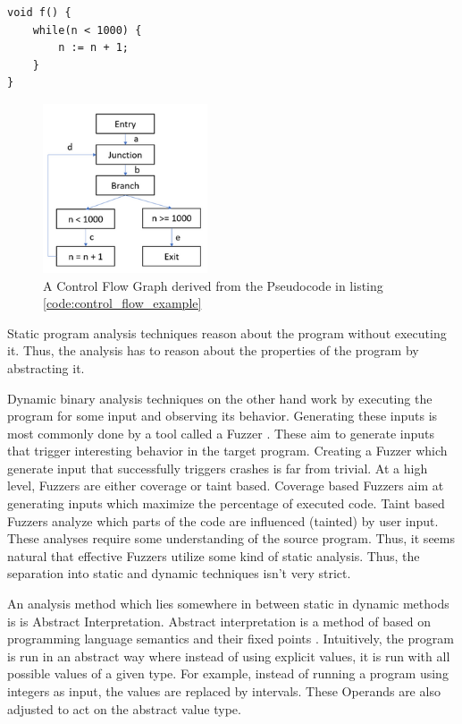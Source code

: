 \documentclass[sigconf]{acmart}
\begin{document}
\begin{lstlisting}[style=CStyle, label=code:control_flow_example, caption={This pseudocode corresponds to the control flow graph in Figure \ref{fig:vuln_example_redirect_control_flow}}]
void f() {
	while(n < 1000) {
		n := n + 1;	
	}
}
\end{lstlisting}

\begin{figure}[h]
  \centering
  \includegraphics[height=5cm]{control-flow-graph}
  \caption{A Control Flow Graph derived from the Pseudocode in listing \ref{code:control_flow_example}}  
\label{fig:vuln_example_redirect_control_flow}
\end{figure}

Static program analysis techniques reason about the program without executing it. Thus, the analysis has to reason about the properties of the program by abstracting it.

Dynamic binary analysis techniques on the other hand work by executing the program for some input and observing its behavior. Generating these inputs is most commonly done by a tool called a Fuzzer \cite{li_fuzzing_2018}. These aim to generate inputs that trigger interesting behavior in the target program. Creating a Fuzzer which generate input that successfully triggers crashes is far from trivial. At a high level, Fuzzers are either coverage or taint based. Coverage based Fuzzers aim at generating inputs which maximize the percentage of executed code. Taint based Fuzzers analyze which parts of the code are influenced (tainted) by user input. These analyses require some understanding of the source program. Thus, it seems natural that effective Fuzzers utilize some kind of static analysis. Thus, the separation into static and dynamic techniques isn't very strict.

An analysis method which lies somewhere in between static in dynamic methods is is Abstract Interpretation. Abstract interpretation is a method of based on programming language semantics and their fixed points \cite{cousot_abstract_2000}. Intuitively, the program is run in an abstract way where instead of using explicit values, it is run with all possible values of a given type. For example, instead of running a program using integers as input, the values are replaced by intervals. These Operands are also adjusted to act on the abstract value type. 
\end{document}
